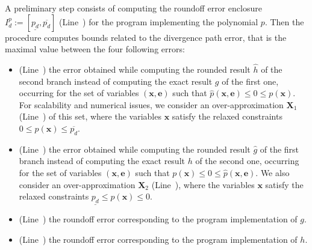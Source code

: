 \documentclass[preprint,fleqn,nocopyrightspace]{sigplanconf}
\newcommand{\x}{\mathbf{x}}
\newcommand{\e}{\mathbf{e}}
\def\X{\mathbf{X}}
\theoremstyle{plain}
\begin{document}
A preliminary step consists of computing the roundoff error enclosure $I_d^p := [\underline{p_d}, \overline{p_d}]$ (Line~) for the program implementing the polynomial $p$. 
Then the procedure computes bounds related to the divergence path error, that is the maximal value between the four following errors: 
\begin{itemize}[noitemsep,nolistsep]
\item (Line~) the error obtained while computing the rounded result $\hat{h}$ of the second branch instead of computing the exact result $g$ of the first one, occurring for the set of variables $(\x,\e)$ such that $\hat{p}(\x,\e) \leq 0 \leq p(\x)$. For scalability and numerical issues, we consider an over-approximation $\X_1$ (Line~) of this set, where the variables $\x$ satisfy the relaxed constraints $0 \leq p(\x) \leq \overline{p_d}$.
\item (Line~) the error obtained while computing the rounded result $\hat{g}$ of the first branch instead of computing the exact result $h$ of the second one, occurring for the set of variables $(\x,\e)$ such that $p(\x) \leq 0 \leq \hat{p}(\x,\e)$. We also consider an over-approximation $\X_2$ (Line~), where the variables $\x$ satisfy the relaxed constraints $\underline{p_d} \leq p(\x) \leq 0$.
\item (Line~) the roundoff error corresponding to the program implementation of $g$.
\item(Line~) the roundoff error corresponding to the program implementation of $h$.
\end{itemize}
%
\end{document}
